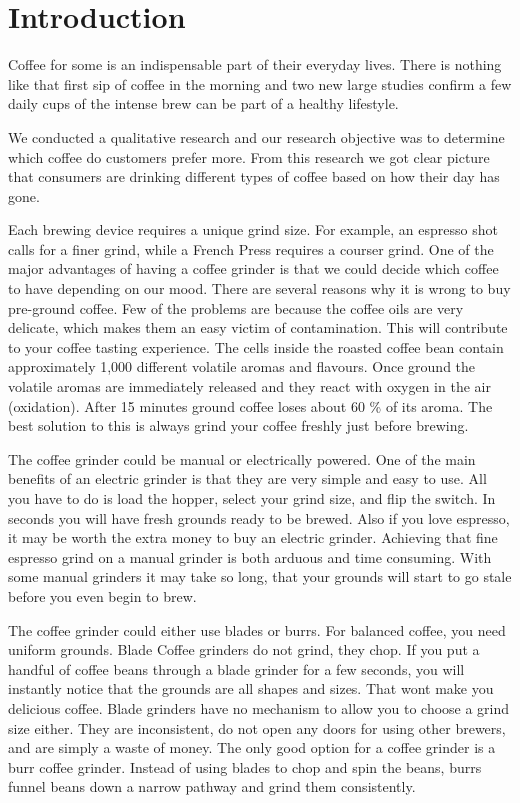  \chapter*{Introduction}

\noindent Coffee for some is an indispensable part of their everyday lives. There is nothing like that first sip of coffee in the morning and two new large studies confirm a few daily cups of the intense brew can be part of a healthy lifestyle. 

\noindent We conducted a qualitative research and our research objective was to determine which coffee do customers prefer more. From this research we got clear picture that consumers are drinking different types of coffee based on how their day has gone.

\noindent Each brewing device requires a unique grind size. For example, an espresso shot calls for a finer grind, while a French Press requires a courser grind. One of the major advantages of having a coffee grinder is that we could decide which coffee to have depending on our mood. There are several reasons why it is wrong to buy pre-ground coffee. Few of the problems are because the coffee oils are very delicate, which makes them an easy victim of contamination. This will contribute to your coffee tasting experience. The cells inside the roasted coffee bean contain approximately 1,000 different volatile aromas and flavours. Once ground the volatile aromas are immediately released and they react with oxygen in the air (oxidation). After 15 minutes ground coffee loses about 60 \% of its aroma. The best solution to this is always grind your coffee freshly just before brewing.

 \noindent The coffee grinder could be manual or electrically powered. One of the main benefits of an electric grinder is that they are very simple and easy to use. All you have to do is load the hopper, select your grind size, and flip the switch. In seconds you will have fresh grounds ready to be brewed. Also if you love espresso, it may be worth the extra money to buy an electric grinder. Achieving that fine espresso grind on a manual grinder is both arduous and time consuming. With some manual grinders it may take so long, that your grounds will start to go stale before you even begin to brew.

\noindent The coffee grinder could either use blades or burrs. For balanced coffee, you need uniform grounds. Blade Coffee grinders do not grind, they chop. If you put a handful of coffee beans through a blade grinder for a few seconds, you will instantly notice that the grounds are all shapes and sizes. That wont make you delicious coffee. Blade grinders have no mechanism to allow you to choose a grind size either. They are inconsistent, do not open any doors for using other brewers, and are simply a waste of money. The only good option for a coffee grinder is a burr coffee grinder. Instead of using blades to chop and spin the beans, burrs funnel beans down a narrow pathway and grind them consistently.

